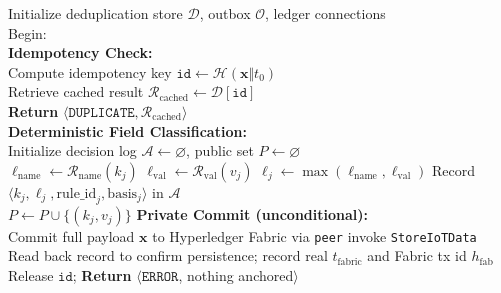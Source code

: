 \documentclass[final,5p,times,twocolumn]{elsarticle}
\begin{document}
\begin{algorithm}[!htbp]
\scriptsize
\color{black}
\caption{\textcolor{black}{Pseudocode for deterministic policy-driven routing and commit}}
\label{alg:routing}
Initialize deduplication store $\mathcal{D}$, outbox $\mathcal{O}$, ledger connections \\
\BlankLine
Begin: \\
\textbf{Idempotency Check:} \\
Compute idempotency key $\texttt{id} \leftarrow \mathcal{H}(\mathbf{x}\Vert t_0)$ \\
 {
    Retrieve cached result $\mathcal{R}_{\text{cached}} \leftarrow \mathcal{D}[\texttt{id}]$ \\
    \textbf{Return} $\langle\mathtt{DUPLICATE}, \mathcal{R}_{\text{cached}}\rangle$ \\
}
\BlankLine
\textbf{Deterministic Field Classification:} \\
Initialize decision log $\mathcal{A} \leftarrow \varnothing$, public set $P \leftarrow \varnothing$ \\
 {
    $\ell_{\mathrm{name}} \leftarrow \mathcal{R}_{\mathrm{name}}(k_j)$ 
    $\ell_{\mathrm{val}}  \leftarrow \mathcal{R}_{\mathrm{val}}(v_j)$ 
    $\ell_j \leftarrow \max(\ell_{\mathrm{name}}, \ell_{\mathrm{val}})$ 
    Record $\langle k_j, \ell_j, \mathrm{rule\_id}_j, \mathrm{basis}_j\rangle$ in $\mathcal{A}$ \\
     {
        $P \leftarrow P \cup \{(k_j,v_j)\}$ 
    }
}
\BlankLine
\textbf{Private Commit (unconditional):} \\
Commit full payload $\mathbf{x}$ to Hyperledger Fabric via \texttt{peer} invoke \texttt{StoreIoTData} \\
Read back record to confirm persistence; record real $t_{\text{fabric}}$ and Fabric tx id $h_{\mathrm{fab}}$ \\
 {
    Release $\texttt{id}$; \textbf{Return} $\langle\mathtt{ERROR}$, nothing anchored$\rangle$ 
}
\end{algorithm}
\end{document}
